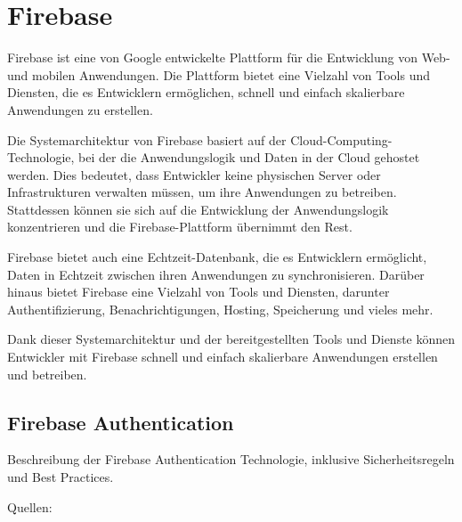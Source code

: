 



\section{Firebase}
Firebase\cite{firebase} ist eine von Google entwickelte Plattform für die Entwicklung von Web- und mobilen Anwendungen. Die Plattform bietet eine Vielzahl von Tools und Diensten, die es Entwicklern ermöglichen, schnell und einfach skalierbare Anwendungen zu erstellen.

Die Systemarchitektur von Firebase basiert auf der Cloud-Computing-Technologie, bei der die Anwendungslogik und Daten in der Cloud gehostet werden. Dies bedeutet, dass Entwickler keine physischen Server oder Infrastrukturen verwalten müssen, um ihre Anwendungen zu betreiben. Stattdessen können sie sich auf die Entwicklung der Anwendungslogik konzentrieren und die Firebase-Plattform übernimmt den Rest.

Firebase bietet auch eine Echtzeit-Datenbank, die es Entwicklern ermöglicht, Daten in Echtzeit zwischen ihren Anwendungen zu synchronisieren. Darüber hinaus bietet Firebase eine Vielzahl von Tools und Diensten, darunter Authentifizierung, Benachrichtigungen, Hosting, Speicherung und vieles mehr.

Dank dieser Systemarchitektur und der bereitgestellten Tools und Dienste können Entwickler mit Firebase schnell und einfach skalierbare Anwendungen erstellen und betreiben.

\subsection{Firebase Authentication}

Beschreibung der Firebase Authentication Technologie, inklusive Sicherheitsregeln und Best Practices.

Quellen:

